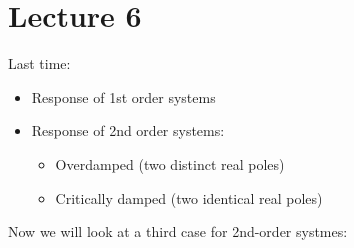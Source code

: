 \documentclass{book}
\begin{document}
\chapter*{Lecture 6}
Last time:
\begin{itemize}
	\item Response of 1st order systems
	\item Response of 2nd order systems:
	\begin{itemize}
		\item Overdamped (two distinct real poles)
		\item Critically damped (two identical real poles)
	\end{itemize}
\end{itemize}

Now we will look at a third case for 2nd-order systmes:
\end{document}
